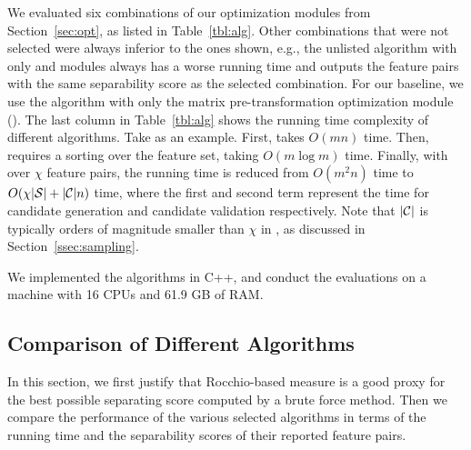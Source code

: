 We evaluated six combinations of our optimization modules 
from Section~\ref{sec:opt}, as listed in Table~\ref{tbl:alg}. 
Other combinations that were not selected were always 
inferior to the ones shown, e.g., 
the unlisted algorithm with only \trans and \earlyT modules 
always has a worse running time and 
outputs the \topk feature pairs with the same separability score as the selected \earlyOrder combination. 
For our baseline, we use the algorithm 
with only the matrix pre-transformation optimization module (\trans). 
The last column in Table~\ref{tbl:alg} shows the running time complexity 
of different algorithms. Take \horiz as an example. 
First,  \trans takes $O(mn)$ time. 
Then, \traversal requires a sorting over the feature set, taking $O(m\log m)$ time. Finally, with \sampling over $\chi$ feature pairs, 
the running time is reduced from $O(m^2n)$ time to $O(\chi|{\mathcal{S}}|+|{\mathcal{C}}|n)$ time, where the first and second term represent the time for candidate generation and candidate validation respectively. Note that $|{\mathcal{C}}|$ is typically orders of magnitude smaller than $\chi$ in \horiz, as discussed in Section~\ref{ssec:sampling}.

 We implemented the algorithms in C++, and conduct the evaluations on a machine with 16 CPUs and 61.9 GB of RAM.

\subsection{Comparison of Different Algorithms}
\label{sec:exp_comp}

In this section, we first 
justify that Rocchio-based measure 
is a good proxy for the best possible separating score 
computed by a brute force method. 
Then we compare the performance of the 
various selected algorithms in terms of the 
running time and the separability scores of their \topthousand reported feature pairs.

